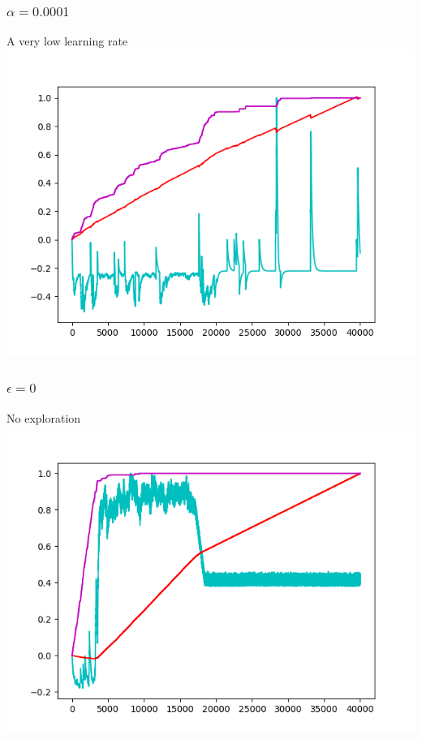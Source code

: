 \documentclass{article}
\begin{document}
\subsubsection{$\alpha = 0.0001$}
A very low learning rate\\
\includegraphics{borgies_alpha0001.png}

\subsubsection{$\epsilon = 0$}
No exploration\\
\includegraphics{borgies_epsilon0000.png}
\end{document}
